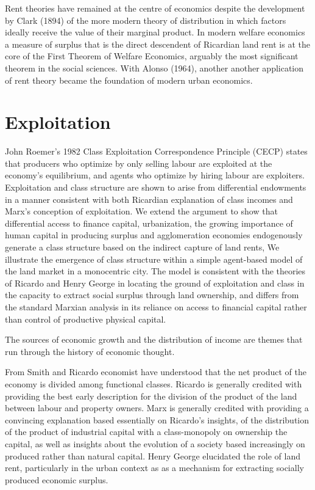 Rent theories have remained at the centre of economics despite the development by Clark (1894) of the more modern theory of distribution in which factors ideally receive the value of their marginal product. In modern welfare economics a measure of surplus that is the direct descendent of Ricardian land rent is at the core of the First Theorem of Welfare Economics, arguably the most significant theorem in the social sciences. With Alonso (1964), another another application of rent theory became the foundation of modern urban economics.

\section{Exploitation}
John Roemer’s 1982 Class Exploitation Correspondence Principle (CECP) states that producers who optimize by only selling labour are exploited at the economy’s equilibrium, and agents who optimize by hiring labour are exploiters. Exploitation and class structure are shown to arise from differential endowments in a manner consistent with both Ricardian explanation of class incomes and Marx’s conception of exploitation. We extend the argument to show that differential access to finance capital, urbanization, the growing importance of human capital in producing surplus and agglomeration economies endogenously generate a class structure based on the indirect capture of land rents, We illustrate the emergence of class structure within a simple agent-based model of the land market in a monocentric city. The model is consistent with the theories of Ricardo and Henry George in locating the ground of exploitation and class in the capacity to extract social surplus through land ownership, and differs from the standard Marxian analysis in its reliance on access to financial capital rather than control of productive physical capital.

The sources of economic growth and the distribution of income are themes that run through the history of economic thought. 

From Smith and Ricardo economist have understood that the net product of the economy is divided among functional classes.
 Ricardo is generally credited with providing the best early description for the division of the product of the land between labour and property owners. 
 Marx is generally credited with providing a convincing explanation based essentially on Ricardo's insights, of the distribution of the product of industrial capital with a class-monopoly on ownership the capital,  as well as insights about the evolution of a society based increasingly on produced rather than natural capital. 
 Henry George elucidated the role of land rent, particularly in the urban context as as a mechanism for extracting socially produced economic surplus.  


